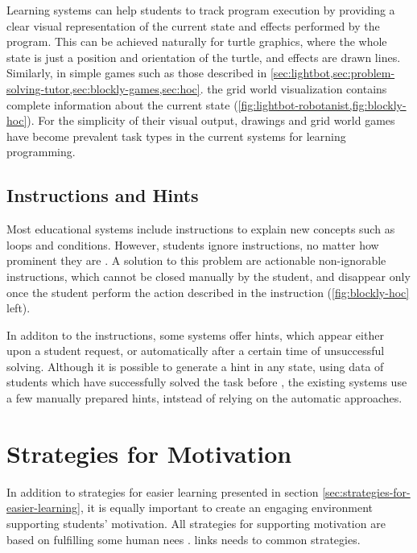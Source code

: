Learning systems can help students to track program execution
  by providing a clear visual representation of the current state
  and effects performed by the program.
This can be achieved naturally for turtle graphics,
  where the whole state is just a position and orientation of the turtle,
  and effects are drawn lines.
Similarly, in simple games such as those described in
  \cref{sec:lightbot,sec:problem-solving-tutor,sec:blockly-games,sec:hoc}.
  the grid world visualization contains complete information about the current
  state (\cref{fig:lightbot-robotanist,fig:blockly-hoc}).
For the simplicity of their visual output,
  drawings and grid world games have become prevalent task types
  in the current systems for learning programming.

\subsection{Instructions and Hints}
\label{sec:instructions-and-hints}

Most educational systems include instructions
  to explain new concepts such as loops and conditions.
However, students ignore instructions,
  no matter how prominent they are \cite{blockly-10-things}.
A solution to this problem are actionable non-ignorable instructions,
  which cannot be closed manually by the student, and disappear only once the
  student perform the action described in the instruction
  (\cref{fig:blockly-hoc} left).

In additon to the instructions, some systems offer hints, which appear either
  upon a student request, or automatically after a certain time of unsuccessful
  solving. Although it is possible to generate a hint in any state,
  using data of students which have successfully solved the task before
  \cite{generating-hints}, the existing systems use a few manually prepared
  hints, intstead of relying on the automatic approaches.

\section{Strategies for Motivation}
\label{sec:motivation}

In addition to strategies for easier learning presented in section
\ref{sec:strategies-for-easier-learning}, it is equally important to create an
engaging environment supporting students’ motivation.
All strategies for supporting motivation are based on fulfilling some human
nees \cite{nvc}. %
 links needs to common strategies.

